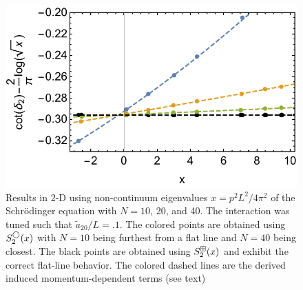 \begin{figure}
    \center
    \includegraphics[width=.65\textwidth]{figure/luescher2d.pdf}
    \caption{
        Results in 2-D using non-continuum eigenvalues $x=p^2L^2/4\pi^2$ of the Schr\"odinger equation with $N=10$, 20, and 40.
        The interaction was tuned such that $\tilde a_{20}/L=.1$.
        The colored points are obtained using $S^\bigcirc_2(x)$ with $N=10$ being furthest from a flat line and $N=40$ being closest.
        The black points are obtained using $S^{\boxplus}_2(x)$ and exhibit the correct flat-line behavior.
        The colored dashed lines are the derived induced momentum-dependent terms (see text) }
    \label{fig:luescher2d}
\end{figure}

